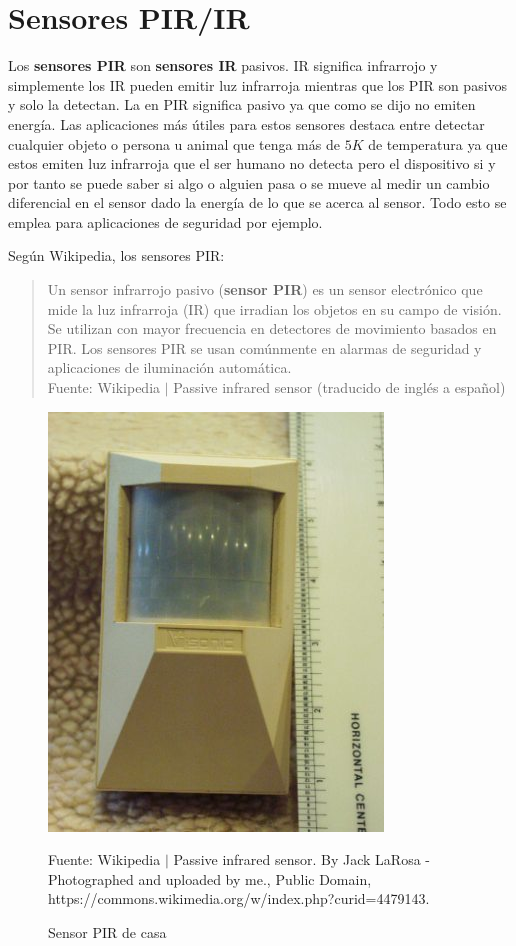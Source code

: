\documentclass[conference]{IEEEtran}
\begin{document}
    \section{Sensores PIR/IR}

    Los \textbf{sensores PIR} son \textbf{sensores IR} pasivos. IR significa infrarrojo y simplemente los IR pueden emitir luz infrarroja mientras que los PIR son pasivos y solo la detectan. La  en PIR significa pasivo ya que como se dijo no emiten energía. Las aplicaciones más útiles para estos sensores destaca entre detectar cualquier objeto o persona u animal que tenga más de $5K$ de temperatura ya que estos emiten luz infrarroja que el ser humano no detecta pero el dispositivo si \cite{jost-ir-sensor-2019} y por tanto se puede saber si algo o alguien pasa o se mueve al medir un cambio diferencial en el sensor dado la energía de lo que se acerca al sensor. Todo esto se emplea para aplicaciones de seguridad por ejemplo.

    \bigbreak

    Según Wikipedia, los sensores PIR:

    \begin{quote}
        Un sensor infrarrojo pasivo (\textbf{sensor PIR}) es un sensor electrónico que mide la luz infrarroja (IR) que irradian los objetos en su campo de visión. Se utilizan con mayor frecuencia en detectores de movimiento basados en PIR. Los sensores PIR se usan comúnmente en alarmas de seguridad y aplicaciones de iluminación automática.\\
        \small Fuente: Wikipedia $\mid$ Passive infrared sensor (traducido de inglés a español) \cite{wikipedia-pir-sensor-2022}
    \end{quote}

    \begin{figure}[H]
        \centering
        \includegraphics[width=0.2\paperwidth]{images/house-pir.jpg}
        \caption{Sensor PIR de casa}
        \footnotesize
        Fuente: Wikipedia $\mid$ Passive infrared sensor. By Jack LaRosa - Photographed and uploaded by me., Public Domain, https://commons.wikimedia.org/w/index.php?curid=4479143.
    \end{figure}
\end{document}
